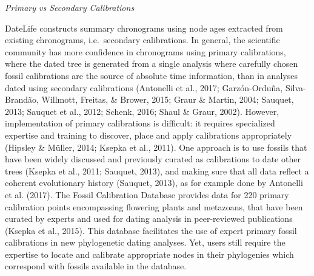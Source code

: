 \documentclass[english,man]{apa6}
\begin{document}
\begin{center}
\emph{Primary vs Secondary Calibrations}
\end{center}

DateLife constructs summary chronograms using node ages extracted from existing chronograms, i.e.~secondary calibrations.
In general, the scientific community has more confidence in chronograms using primary calibrations, where the dated tree is generated from a single analysis where carefully chosen fossil calibrations are the source of absolute time information, than in analyses dated using secondary calibrations (Antonelli et al., 2017; Garzón-Orduña, Silva-Brandão, Willmott, Freitas, \& Brower, 2015; Graur \& Martin, 2004; Sauquet, 2013; Sauquet et al., 2012; Schenk, 2016; Shaul \& Graur, 2002).
However, implementation of primary calibrations is difficult: it requires specialized expertise and training to discover, place and apply calibrations appropriately (Hipsley \& Müller, 2014; Ksepka et al., 2011). One approach is to use fossils that have been widely discussed and previously curated as calibrations to date other trees (Ksepka et al., 2011; Sauquet, 2013), and making sure that all data reflect a coherent evolutionary history (Sauquet, 2013), as for example done by Antonelli et al. (2017).
The Fossil Calibration Database provides data for 220 primary calibration points encompassing flowering plants and metazoans, that have been curated by experts and used for dating analysis in peer-reviewed publications (Ksepka et al., 2015). This database facilitates the use of expert primary fossil calibrations in new phylogenetic dating analyses.
Yet, users still require the expertise to locate and calibrate appropriate nodes in their phylogenies which correspond with fossils available in the database.
\end{document}
